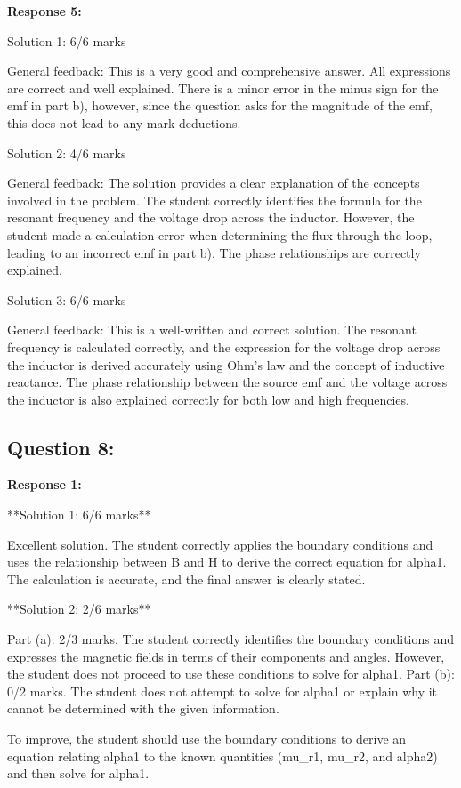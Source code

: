 \documentclass[a4paper,11pt]{article}
\begin{document}
\textbf{Response 5:}

Solution 1: 6/6 marks

General feedback: This is a very good and comprehensive answer. All expressions are correct and well explained. There is a minor error in the minus sign for the emf in part b), however, since the question asks for the magnitude of the emf, this does not lead to any mark deductions.

Solution 2: 4/6 marks

General feedback: The solution provides a clear explanation of the concepts involved in the problem. The student correctly identifies the formula for the resonant frequency and the voltage drop across the inductor. However, the student made a calculation error when determining the flux through the loop, leading to an incorrect emf in part b). The phase relationships are correctly explained.

Solution 3: 6/6 marks

General feedback: This is a well-written and correct solution. The resonant frequency is calculated correctly, and the expression for the voltage drop across the inductor is derived accurately using Ohm's law and the concept of inductive reactance. The phase relationship between the source emf and the voltage across the inductor is also explained correctly for both low and high frequencies.

\subsection{Question 8:}

\textbf{Response 1:}

**Solution 1: 6/6 marks**

Excellent solution. The student correctly applies the boundary conditions and uses the relationship between B and H to derive the correct equation for alpha1. The calculation is accurate, and the final answer is clearly stated.

**Solution 2: 2/6 marks**

Part (a): 2/3 marks. The student correctly identifies the boundary conditions and expresses the magnetic fields in terms of their components and angles. However, the student does not proceed to use these conditions to solve for alpha1.
Part (b): 0/2 marks. The student does not attempt to solve for alpha1 or explain why it cannot be determined with the given information.

To improve, the student should use the boundary conditions to derive an equation relating alpha1 to the known quantities (mu_r1, mu_r2, and alpha2) and then solve for alpha1.
\end{document}
